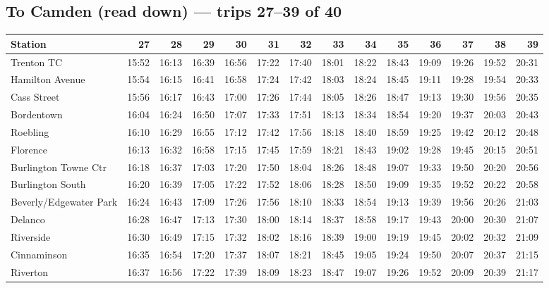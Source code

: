 \subsection*{To Camden (read down) --- trips 27--39 of 40}
\begin{center}\footnotesize\setlength{\tabcolsep}{3pt}\begin{tabular}{@{}lrrrrrrrrrrrrr@{}}\toprule
Station & 27 & 28 & 29 & 30 & 31 & 32 & 33 & 34 & 35 & 36 & 37 & 38 & 39 \\\midrule
Trenton TC & 15:52 & 16:13 & 16:39 & 16:56 & 17:22 & 17:40 & 18:01 & 18:22 & 18:43 & 19:09 & 19:26 & 19:52 & 20:31 \\
Hamilton Avenue & 15:54 & 16:15 & 16:41 & 16:58 & 17:24 & 17:42 & 18:03 & 18:24 & 18:45 & 19:11 & 19:28 & 19:54 & 20:33 \\
Cass Street & 15:56 & 16:17 & 16:43 & 17:00 & 17:26 & 17:44 & 18:05 & 18:26 & 18:47 & 19:13 & 19:30 & 19:56 & 20:35 \\
Bordentown & 16:04 & 16:24 & 16:50 & 17:07 & 17:33 & 17:51 & 18:13 & 18:34 & 18:54 & 19:20 & 19:37 & 20:03 & 20:43 \\
Roebling & 16:10 & 16:29 & 16:55 & 17:12 & 17:42 & 17:56 & 18:18 & 18:40 & 18:59 & 19:25 & 19:42 & 20:12 & 20:48 \\
Florence & 16:13 & 16:32 & 16:58 & 17:15 & 17:45 & 17:59 & 18:21 & 18:43 & 19:02 & 19:28 & 19:45 & 20:15 & 20:51 \\
Burlington Towne Ctr & 16:18 & 16:37 & 17:03 & 17:20 & 17:50 & 18:04 & 18:26 & 18:48 & 19:07 & 19:33 & 19:50 & 20:20 & 20:56 \\
Burlington South & 16:20 & 16:39 & 17:05 & 17:22 & 17:52 & 18:06 & 18:28 & 18:50 & 19:09 & 19:35 & 19:52 & 20:22 & 20:58 \\
Beverly/Edgewater Park & 16:24 & 16:43 & 17:09 & 17:26 & 17:56 & 18:10 & 18:33 & 18:54 & 19:13 & 19:39 & 19:56 & 20:26 & 21:03 \\
Delanco & 16:28 & 16:47 & 17:13 & 17:30 & 18:00 & 18:14 & 18:37 & 18:58 & 19:17 & 19:43 & 20:00 & 20:30 & 21:07 \\
Riverside & 16:30 & 16:49 & 17:15 & 17:32 & 18:02 & 18:16 & 18:39 & 19:00 & 19:19 & 19:45 & 20:02 & 20:32 & 21:09 \\
Cinnaminson & 16:35 & 16:54 & 17:20 & 17:37 & 18:07 & 18:21 & 18:45 & 19:05 & 19:24 & 19:50 & 20:07 & 20:37 & 21:15 \\
Riverton & 16:37 & 16:56 & 17:22 & 17:39 & 18:09 & 18:23 & 18:47 & 19:07 & 19:26 & 19:52 & 20:09 & 20:39 & 21:17 \\

\end{tabular}
\end{center}
